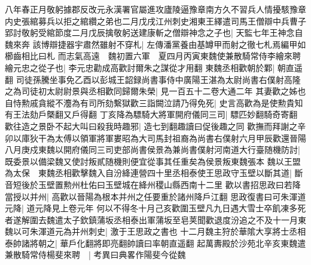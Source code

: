 八年春正月敬躬據郡反改元永漢署官屬進攻廬陵逼豫章南方久不習兵人情擾駭豫章内史張綰募兵以拒之綰纘之弟也二月戊戌江州刺史湘東王繹遣司馬王僧辯中兵曹子郢討敬躬受綰節度二月戊辰擒敬躬送建康斬之僧辯神念之子也|{
	天監七年王神念自魏來奔}
該博辯捷器宇肅然雖射不穿札|{
	左傳潘黨養由基罇甲而射之徹七札焉編甲如櫛齒相比曰札}
而志氣高遠　魏初置六軍　夏四月丙寅東魏使兼散騎常侍李繪來聘繪元忠之從子也|{
	李元忠勸成高歡討爾朱之謀從才用翻}
東魏丞相歡朝於鄴|{
	朝直遥翻}
司徒孫騰坐事免乙酉以彭城王韶録尚書事侍中廣陽王湛為太尉尚書右僕射高隆之為司徒初太尉尉景與丞相歡同歸爾朱榮|{
	見一百五十二卷大通二年}
其妻歡之姊也自恃勲戚貪縱不灋為有司所劾繫獄歡三詣闕泣請乃得免死|{
	史言高歡為是使勲貴知有王法劾戶槩翻又戶得翻}
丁亥降為驃騎大將軍開府儀同三司|{
	驃匹妙翻騎奇寄翻}
歡往造之景卧不起大叫曰殺我時趣邪|{
	造七到翻趣讀曰促後趣之同}
歡撫而拜謝之辛卯以庫狄干為太傅以領軍將軍婁昭為大司馬封祖裔為尚書右僕射六月甲辰歡還晉陽　八月庚戍東魏以開府儀同三司吏部尚書侯景為兼尚書僕射河南道大行臺随機防討|{
	既委景以備梁魏又使討叛貳随機則便宜從事其任重矣為侯景叛東魏張本}
魏以王盟為太保　東魏丞相歡擊魏入自汾絳連營四十里丞相泰使王思政守玉壁以斷其道|{
	斷音短後於玉壁置勲州杜佑曰玉壁城在絳州稷山縣西南十二里}
歡以書招思政曰若降當授以并州|{
	高歡以晉陽為根本并州之任要重於諸州降戶江翻}
思政復書曰可朱渾道元降|{
	道元降見上卷元年}
何以不得冬十月己亥歡圍玉壁凡九日遇大雪士卒飢凍多死者遂解圍去魏遣太子欽鎮蒲坂丞相泰出軍蒲坂至皂荚聞歡退度汾追之不及十一月東魏以可朱渾道元為并州刺史|{
	激于王思政之書也}
十二月魏主狩於華隂大享將士丞相泰帥諸將朝之|{
	華戶化翻將即亮翻帥讀曰率朝直遥翻}
起萬夀殿於沙苑北辛亥東魏遣兼散騎常侍楊斐來聘　|{
	考異曰典畧作陽斐今從魏}


